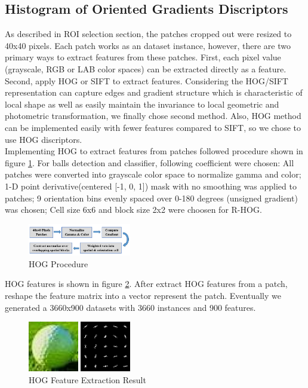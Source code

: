 \documentclass{article}
\begin{document}
\subsection{Histogram of Oriented Gradients Discriptors}
As described in ROI selection section, the patches cropped out were resized to 40x40 pixels. Each patch works as an dataset instance, however, there are two primary ways to extract features from these patches. First, each pixel value (grayscale, RGB or LAB color spaces) can be extracted directly as a feature. Second, apply HOG or SIFT to extract features. Considering the HOG/SIFT representation can capture edges and gradient structure which is characteristic of local shape as well as easily maintain the invariance to local geometric and photometric transformation, we finally chose second method. Also, HOG method can be implemented easily with fewer features compared to SIFT, so we chose to use HOG discriptors.\\  
Implementing HOG to extract features from patches followed procedure shown in figure \ref{fig:HOG}. For balls detection and classifier, following coefficient were chosen: All patches were converted into grayscale color space to normalize gamma and color; 1-D point derivative(centered [-1, 0, 1]) mask with no smoothing was applied to patches; 9 orientation bins evenly spaced over 0-180 degrees (unsigned gradient) was chosen; Cell size 6x6 and block size 2x2 were choosen for R-HOG.  
\begin{figure}[htp]
\centering
\includegraphics[width=0.4\textwidth]{HOG.jpg}
\caption{HOG Procedure}
\label{fig:HOG}
\end{figure}

HOG features is shown in figure \ref{fig:HOGtest}. After extract HOG features from a patch, reshape the feature matrix into a vector represent the patch. Eventually we generated a 3660x900 datasets with 3660 instances and 900 features. 

\begin{figure}[htp]
\centering
\includegraphics[width=0.4\textwidth]{hogtest.jpg}
\caption{HOG Feature Extraction Result}
\label{fig:HOGtest}
\end{figure}
\end{document}
